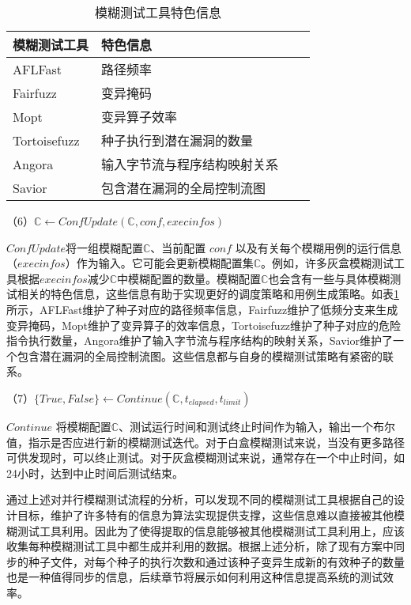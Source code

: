 \documentclass[master]{thesis-uestc}
\begin{document}
\begin{table}[!htbp]
    \caption{模糊测试工具特色信息}
    \begin{tabular}{llll}
    \toprule
    模糊测试工具& 特色信息 \\
    \midrule
    AFLFast & 路径频率 \\
    Fairfuzz & 变异掩码 \\
    Mopt & 变异算子效率 \\
    Tortoisefuzz & 种子执行到潜在漏洞的数量 \\
    Angora & 输入字节流与程序结构映射关系 \\
    Savior & 包含潜在漏洞的全局控制流图 \\
    \bottomrule
    \end{tabular}
    \label{table_info}
    \vspace{6pt}
\end{table}

（6）$\mathbb{C} \leftarrow ConfUpdate(\mathbb{C}, conf, execinfos)$

$ConfUpdate$将一组模糊配置$\mathbb{C}$、当前配置 $conf$ 以及有关每个模糊用例的运行信息（$execinfos$）作为输入。它可能会更新模糊配置集$\mathbb{C}$。例如，许多灰盒模糊测试工具根据$execinfos$减少$\mathbb{C}$中模糊配置的数量。模糊配置$\mathbb{C}$也会含有一些与具体模糊测试相关的特色信息，这些信息有助于实现更好的调度策略和用例生成策略。如表\ref{table_info}所示，AFLFast维护了种子对应的路径频率信息，Fairfuzz维护了低频分支来生成变异掩码，Mopt维护了变异算子的效率信息，Tortoisefuzz维护了种子对应的危险指令执行数量，Angora维护了输入字节流与程序结构的映射关系，Savior维护了一个包含潜在漏洞的全局控制流图。这些信息都与自身的模糊测试策略有紧密的联系。

（7）$\{True, False\}\leftarrow Continue(\mathbb{C}, t_{elapsed}, t_{limit})$ 

$Continue$ 将模糊配置$\mathbb{C}$、测试运行时间和测试终止时间作为输入，输出一个布尔值，指示是否应进行新的模糊测试迭代。对于白盒模糊测试来说，当没有更多路径可供发现时，可以终止测试。对于灰盒模糊测试来说，通常存在一个中止时间，如24小时，达到中止时间后测试结束。

通过上述对并行模糊测试流程的分析，可以发现不同的模糊测试工具根据自己的设计目标，维护了许多特有的信息为算法实现提供支撑，这些信息难以直接被其他模糊测试工具利用。因此为了使得提取的信息能够被其他模糊测试工具利用上，应该收集每种模糊测试工具中都生成并利用的数据。根据上述分析，除了现有方案中同步的种子文件，对每个种子的执行次数和通过该种子变异生成新的有效种子的数量也是一种值得同步的信息，后续章节将展示如何利用这种信息提高系统的测试效率。
\end{document}
